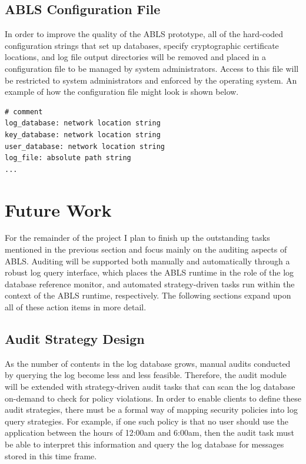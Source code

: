 \documentclass{sig-alternate}
\begin{document}
\subsection{ABLS Configuration File} 
In order to improve the quality of the ABLS prototype, all of the hard-coded configuration strings that set up databases,
specify cryptographic certificate locations, and log file output directories will be removed and placed in a configuration file
to be managed by system administrators. Access to this file will be restricted to system administrators and enforced by the 
operating system. An example of how the configuration file might look is shown below.

\begin{lstlisting}
# comment
log_database: network location string
key_database: network location string
user_database: network location string
log_file: absolute path string
...
\end{lstlisting}

\section{Future Work}
For the remainder of the project I plan to finish up the outstanding tasks mentioned in the previous section and 
focus mainly on the auditing aspects of ABLS. Auditing will be supported both manually and automatically through
a robust log query interface, which places the ABLS runtime in the role of the log database reference monitor, and 
automated strategy-driven tasks run within the context of the ABLS runtime, respectively. The following 
sections expand upon all of these action items in more detail.

\subsection{Audit Strategy Design}
As the number of contents in the log database grows, manual audits conducted by querying the log become less and less 
feasible. Therefore, the audit module will be extended with strategy-driven audit tasks that can scan the log database 
on-demand to check for policy violations. In order to enable clients to define these audit strategies, there must be a 
formal way of mapping security policies into log query strategies. For example, if one such policy is that no user should use 
the application between the hours of 12:00am and 6:00am, then the audit task must be able to interpret this information
and query the log database for messages stored in this time frame. 
\end{document}
